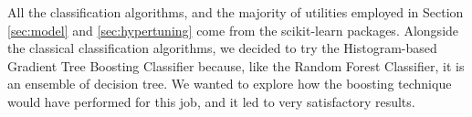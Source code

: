 \documentclass[conference]{IEEEtran}
\begin{document}
All the classification algorithms, and the majority of utilities employed in Section \ref{sec:model} and \ref{sec:hypertuning} come from the scikit-learn packages\cite{scikit-learn}. Alongside the classical classification algorithms, we decided to try the Histogram-based Gradient Tree Boosting Classifier because, like the Random Forest Classifier, it is an ensemble of decision tree. We wanted to explore how the boosting technique would have performed for this job, and it led to very satisfactory results.


\end{document}
